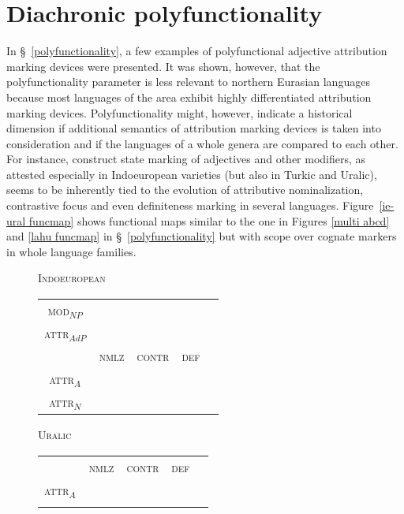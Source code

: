 {\section{Diachronic polyfunctionality}
In \S~\ref{polyfunctionality}, a few examples of polyfunctional adjective attribution marking devices were presented. It was shown, however, that the polyfunctionality parameter is less relevant to northern Eurasian languages because most languages of the area exhibit highly differentiated attribution marking devices. Polyfunctionality might, however, indicate a historical dimension if additional semantics of attribution marking devices is taken into consideration and if the languages of a whole genera are compared to each other. For instance, construct state marking of adjectives and other modifiers, as attested especially in Indoeuropean varieties (but also in Turkic and Uralic), seems to be inherently tied to the evolution of attributive nominalization, contrastive focus and even definiteness marking in several languages. Figure~\ref{ie-ural funcmap} shows functional maps similar to the one in Figures \ref{multi abcd} and \ref{lahu funcmap} in \S~\ref{polyfunctionality} but with scope over cognate markers in whole language families.
\begin{figure}[htbp]
\parbox[b]{0.5\textwidth}{
\begin{center}\textsc{Indoeuropean}\\
\medskip
\begin{tabular}{| c || c | c | c | c}
\cline{1-1}
\textsc{mod}$_{NP}$\\
\cline{1-1}
\textsc{attr}$_{AdP}$\\
\hline
 & \textsc{nmlz} & \textsc{contr} & \textsc{def}\\
\hline
\textsc{attr}$_{A}$\\
\cline{1-1}
\textsc{attr}$_{N}$\\
\cline{1-1}
\end{tabular}
\end{center}
}
\parbox[b]{0.5\textwidth}{
\begin{center}\textsc{Uralic}\\
\medskip
\begin{tabular}{| c || c | c | c | c}
\cline{1-1}
\\
\cline{1-1}
\\
\hline
 & \textsc{nmlz} & \textsc{contr} & \textsc{def}\\
\hline
\textsc{attr}$_{A}$\\
\cline{1-1}
\\
\cline{1-1}
\end{tabular}
\end{center}
}


\end{figure}}
